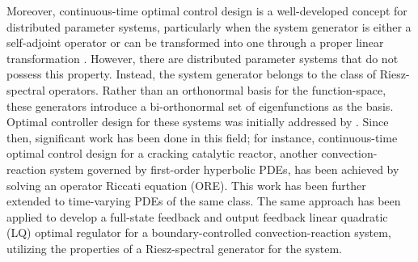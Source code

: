 Moreover, continuous-time optimal control design is a well-developed concept for distributed parameter systems, particularly when the system generator is either a self-adjoint operator or can be transformed into one through a proper linear transformation \autocite{morrisbook}. However, there are distributed parameter systems that do not possess this property. Instead, the system generator belongs to the class of Riesz-spectral operators. Rather than an orthonormal basis for the function-space, these generators introduce a bi-orthonormal set of eigenfunctions as the basis. Optimal controller design for these systems was initially addressed by  \autocite{curtainbook}. Since then, significant work has been done in this field; for instance, continuous-time optimal control design for a cracking catalytic reactor, another convection-reaction system governed by first-order hyperbolic PDEs, has been achieved by solving an operator Riccati equation (ORE)\autocite{aksikas2009lq}. This work has been further extended to time-varying PDEs of the same class\autocite{aksikas2013optimal}. The same approach has been applied to develop a full-state feedback\autocite{mohammadi2012lq} and output feedback\autocite{aksikas2024spectral} linear quadratic (LQ) optimal regulator for a boundary-controlled convection-reaction system, utilizing the properties of a Riesz-spectral generator for the system.

